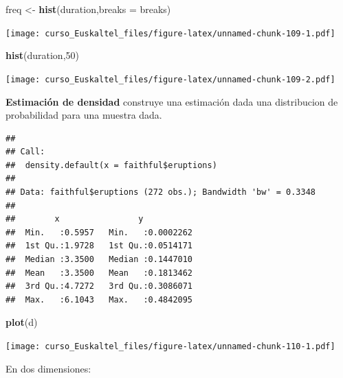 \documentclass[]{book}
\newenvironment{Shaded}{\begin{snugshade}}{\end{snugshade}}
\newcommand{\KeywordTok}[1]{\textcolor[rgb]{0.13,0.29,0.53}{\textbf{#1}}}
\newcommand{\DataTypeTok}[1]{\textcolor[rgb]{0.13,0.29,0.53}{#1}}
\newcommand{\DecValTok}[1]{\textcolor[rgb]{0.00,0.00,0.81}{#1}}
\newcommand{\StringTok}[1]{\textcolor[rgb]{0.31,0.60,0.02}{#1}}
\newcommand{\OperatorTok}[1]{\textcolor[rgb]{0.81,0.36,0.00}{\textbf{#1}}}
\newcommand{\NormalTok}[1]{#1}
\begin{document}
\begin{Shaded}
\begin{Highlighting}[]
\NormalTok{freq <-}\StringTok{ }\KeywordTok{hist}\NormalTok{(duration,}\DataTypeTok{breaks =}\NormalTok{ breaks)}
\end{Highlighting}
\end{Shaded}

\texttt{[image: curso\_Euskaltel\_files/figure-latex/unnamed-chunk-109-1.pdf]}

\begin{Shaded}
\begin{Highlighting}[]
\KeywordTok{hist}\NormalTok{(duration,}\DecValTok{50}\NormalTok{)}
\end{Highlighting}
\end{Shaded}

\texttt{[image: curso\_Euskaltel\_files/figure-latex/unnamed-chunk-109-2.pdf]}

\textbf{Estimación de densidad} construye una estimación dada una
distribucion de probabilidad para una muestra dada.

\begin{Shaded}
\end{Shaded}

\begin{verbatim}
## 
## Call:
##  density.default(x = faithful$eruptions)
## 
## Data: faithful$eruptions (272 obs.); Bandwidth 'bw' = 0.3348
## 
##        x                y            
##  Min.   :0.5957   Min.   :0.0002262  
##  1st Qu.:1.9728   1st Qu.:0.0514171  
##  Median :3.3500   Median :0.1447010  
##  Mean   :3.3500   Mean   :0.1813462  
##  3rd Qu.:4.7272   3rd Qu.:0.3086071  
##  Max.   :6.1043   Max.   :0.4842095
\end{verbatim}

\begin{Shaded}
\begin{Highlighting}[]
\KeywordTok{plot}\NormalTok{(d)}
\end{Highlighting}
\end{Shaded}

\texttt{[image: curso\_Euskaltel\_files/figure-latex/unnamed-chunk-110-1.pdf]}

En dos dimensiones:
\end{document}

